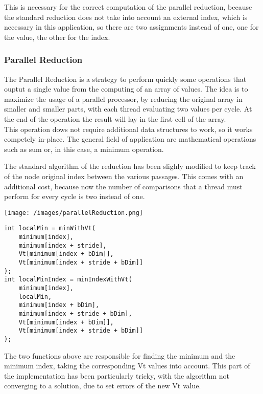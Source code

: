 \documentclass[
	a4paper, %
	12pt, %
]{class}
\begin{document}
This is necessary for the correct computation of the parallel reduction, because the standard reduction does not take into account an external index, which is necessary
in this application, so there are two assignments instead of one, one for the value, the other for the index.

\subsubsection{Parallel Reduction}
The Parallel Reduction is a strategy to perform quickly some operations that ouptut a single value from the computing of an array of values.
The idea is to maximize the usage of a parallel processor, by reducing the original array in smaller and smaller parts, with each thread evaluating two values per cycle.
At the end of the operation the result will lay in the first cell of the array.\\

This operation dows not require additional data structures to work, so it works competely in-place. The general field of application are mathematical operations such as sum or, in this case, a
minimum operation.

The standard algorithm of the reduction has been slighly modified to keep track of the node original index between the various passages. This comes with an additional
cost, because now the number of comparisons that a thread must perform for every cycle is two instead of one.


\begin{center}
    \texttt{[image: /images/parallelReduction.png]}
\end{center}
\begin{verbatim}
int localMin = minWithVt(
    minimum[index],
    minimum[index + stride],
    Vt[minimum[index + bDim]],
    Vt[minimum[index + stride + bDim]]
);
int localMinIndex = minIndexWithVt(
    minimum[index],
    localMin,
    minimum[index + bDim],
    minimum[index + stride + bDim],
    Vt[minimum[index + bDim]],
    Vt[minimum[index + stride + bDim]]
);
\end{verbatim}
The two functions above are responsible for finding the minimum and the minimum index, taking the corresponding Vt values into account.
This part of the implementation has been particularly tricky, with the algorithm not converging to a solution, due to set errors of the new Vt value.\\
\end{document}
